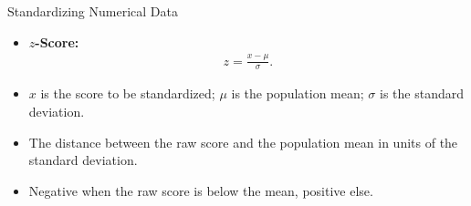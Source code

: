 \begin{frame}{Standardizing Numerical Data}
	\begin{itemize}
		\item \textbf{$z$-Score:}
		      \begin{align*}
			      z = \frac{x-\mu}{\sigma}.
		      \end{align*}
		\item $x$ is the score to be standardized; $\mu$ is the population mean; $\sigma$ is the standard deviation.
		\item The distance between the raw score and the population mean in units of the standard deviation.
		\item Negative when the raw score is below the mean, positive else.

	\end{itemize}
\end{frame}

